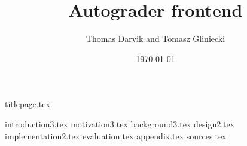 \documentclass[12pt]{report}
\title{Autograder frontend}
\author{Thomas Darvik and Tomasz Gliniecki}
\date{\today}
\begin{document}

{titlepage.tex}

\tableofcontents
{}
{introduction3.tex}
{motivation3.tex}
{background3.tex}
{design2.tex}
{implementation2.tex}
{evaluation.tex}
{appendix.tex}
{sources.tex}
\printindex
\end{document}
